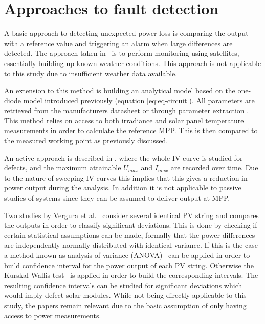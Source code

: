 \clearpage
\section{Approaches to fault detection}
A basic approach to detecting unexpected power loss is comparing the output with a reference value and triggering an alarm when large differences are detected.
The approach taken in~\cite{Stettler2005} is to perform monitoring using satellites, essentially building up known weather conditions.
This approach is not applicable to this study due to insufficient weather data available.

An extension to this method is building an analytical model \cite{Chouder2010,Raina2013,Chao2008}
based on the one-diode model introduced previously (equation \ref{eq:eq-circuit}).
All parameters are retrieved from the manufacturers datasheet or through parameter extraction \cite{Eicker2005,Chouder2009,Walker2001}.
This method relies on access to both irradiance and solar panel temperature measurements in order to calculate the reference MPP.
This is then compared to the measured working point as previously discussed.

An active approach is described in \cite{Meyer2004}, where the whole IV-curve is studied for defects, and the maximum attainable $U_{max}$ and $I_{max}$ are recorded over time.
Due to the nature of sweeping IV-curves this implies that this gives a reduction in power output during the analysis.
In addition it is not applicable to passive studies of systems since they can be assumed to deliver output at MPP.

Two studies by Vergura et al.~\cite{Vergura2008,Vergura2009} consider several identical PV string and compares the outputs in order to classify significant deviations.
This is done by checking if certain statistical assumptions can be made, formally that the power differences are independently normally distributed with identical variance.
If this is the case a method known as analysis of variance (ANOVA)~\cite{Vergura2009} can be applied in order to build confidence interval for the power output of each PV string.
Otherwise the Kurskal-Wallis test~\cite{Vergura2009} is applied in order to build the corresponding intervals.
The resulting confidence intervals can be studied for significant deviations which would imply defect solar modules.
While not being directly applicable to this study, the papers remain relevant due to the basic assumption of only having access to power measurements.

